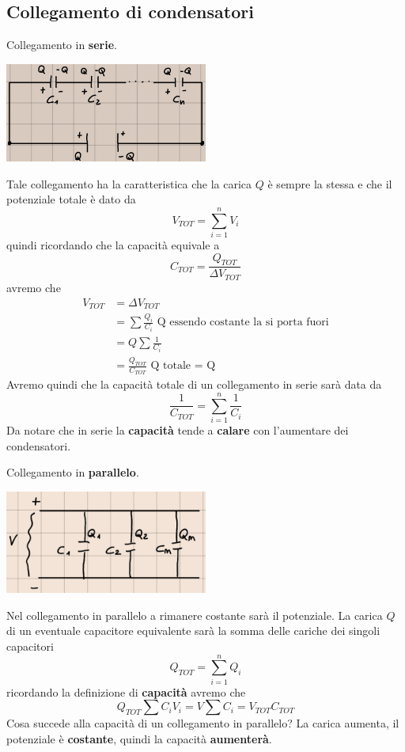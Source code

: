 \documentclass[a4paper, 12pt]{book}
\theoremstyle{plain}
\begin{document}
\subsection{Collegamento di condensatori}

Collegamento in \textbf{serie}.

\begin{center}
    \includegraphics[width=0.5\textwidth]{coll_serie.jpg}
\end{center}
Tale collegamento ha la caratteristica che la carica 
$Q$ è sempre la stessa e che il potenziale totale è dato 
da \[ V_{TOT} = \sum_{i = 1}^n V_i \] quindi ricordando 
che la capacità equivale a \[ C_{TOT} = \frac{Q_{TOT}}{\Delta V_{TOT}} \]
avremo che 
\[
    \begin{split}
        V_{TOT} &= \Delta V_{TOT} \\
        &= \sum \frac{Q_i}{C_i} \textrm{ Q essendo costante la si porta fuori} \\
        &= Q \sum \frac{1}{C_i} \\
        &= \frac{Q_{TOT}}{C_{TOT}} \textrm{ Q totale = Q}
    \end{split}
\]
Avremo quindi che la capacità totale di un collegamento 
in serie sarà data da \[ \frac{1}{C_{TOT}} = \sum_{i = 1}^n \frac{1}{C_i} \]
Da notare che in serie la \textbf{capacità} tende a \textbf{calare} con 
l'aumentare dei condensatori.

Collegamento in \textbf{parallelo}.

\begin{center}
    \includegraphics[width=0.5\textwidth]{coll_parall.png}
\end{center}
Nel collegamento in parallelo a rimanere costante sarà 
il potenziale. La carica $Q$ di un eventuale capacitore 
equivalente sarà la somma delle cariche dei singoli 
capacitori \[Q_{TOT} = \sum_{i = 1}^n Q_i \] ricordando 
la definizione di \textbf{capacità} avremo che \[ Q_{TOT}
\sum C_i V_i = V \sum C_i = V_{TOT} C_{TOT} \] Cosa succede 
alla capacità di un collegamento in parallelo? La carica 
aumenta, il potenziale è \textbf{costante}, quindi la 
capacità \textbf{aumenterà}.
\end{document}
